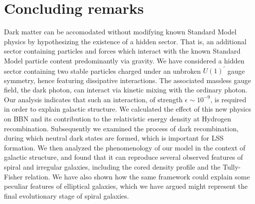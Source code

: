 \documentclass[12pt]{article}
\begin{document}
{{%

\section{Concluding remarks}

Dark matter can be accomodated without modifying known Standard Model physics by hypothesizing the existence of a hidden sector. That is, an additional sector containing particles and forces which interact with the known Standard Model particle content predominantly via gravity. We have considered a hidden sector containing two stable particles charged under an unbroken $U(1) ^{'}$ gauge symmetry, hence featuring dissipative interactions. The associated massless gauge field, the dark photon, can interact via kinetic mixing with the ordinary photon. Our analysis indicates that such an interaction, of strength $\epsilon \sim 10^{-9}$, is required in order to explain galactic structure. We calculated the effect of this new physics on BBN and its contribution to the relativistic energy density at Hydrogen recombination. Subsequently we examined the process of dark recombination, during which neutral dark states are formed, which is important for LSS formation. We then analyzed the phenomenology of our model in the context of galactic structure, and found that it can reproduce several observed features of spiral and irregular galaxies, including the cored density profile and the Tully-Fisher relation. We have also shown how the same framework could explain some peculiar features of elliptical galaxies, which we have argued might represent the final evolutionary stage of spiral galaxies.

}}
\end{document}
